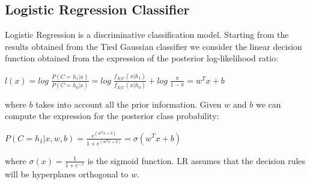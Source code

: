 \documentclass[10pt, a4paper, twocolumn]{article} %
\begin{document}
\subsection{Logistic Regression Classifier}
Logistic Regression is a discriminative classification model. Starting from the results obtained
from the Tied Gaussian classifier we consider the linear decision function obtained from the expression
of the posterior log-likelihood ratio:
\begin{center}
	\begin{math}
		l(x) = log\;\frac{P(C=h_1|x)}{P(C=h_0|x)}=log\;\frac{f_{X|C}(x|h_1)}{f_{X|C}(x|h_0)} + log\;\frac{\pi}{1-\pi} = w^Tx + b
	\end{math}
\end{center}
where $b$ takes into account all the prior information. Given $w$ and $b$ we can compute the
expression for the posterior class probability:
\begin{center}
	\begin{math}
		P(C=h_1|x,w,b)=\frac{e^{(w^Tx + b)}}{1+e^{(w^Tx+b)}}=\sigma(w^Tx+b)
	\end{math}
\end{center}
where $\sigma(x)=\frac{1}{1+e^{-x}}$ is the sigmoid function. LR assumes that the decision rules will be hyperplanes
orthogonal to $w$.
\end{document}
